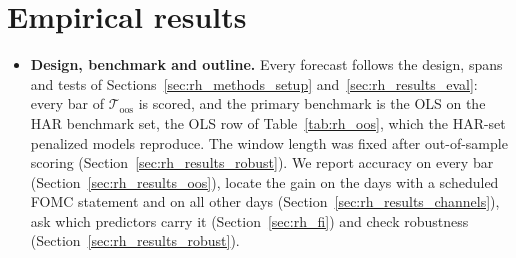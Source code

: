 
\ifdefined\rhabNClassesBeatAddRm\else\fi
\ifdefined\rhcaNdaysSpan\else\fi
\ifdefined\rhmcsNModels\else\fi
\ifdefined\rhchNEventDays\else\fi

\section{Empirical results}
\label{sec:rh_results}
\label{sec:rh_exp_setup}
\begin{itemize}
\item \textbf{Design, benchmark and outline.} Every forecast follows the design, spans and tests of
  Sections~\ref{sec:rh_methods_setup} and~\ref{sec:rh_results_eval}: every bar of $\mathcal T_{\mathrm{oos}}$ is
  scored, and the primary benchmark is the OLS on the HAR benchmark set, the OLS row of Table~\ref{tab:rh_oos}, which
  the HAR-set penalized models reproduce. The window length was fixed after out-of-sample scoring
  (Section~\ref{sec:rh_results_robust}). We report accuracy on every bar (Section~\ref{sec:rh_results_oos}), locate
  the gain on the days with a scheduled FOMC statement and on all other days (Section~\ref{sec:rh_results_channels}),
  ask which predictors carry it (Section~\ref{sec:rh_fi}) and check robustness (Section~\ref{sec:rh_results_robust}).
\end{itemize}

